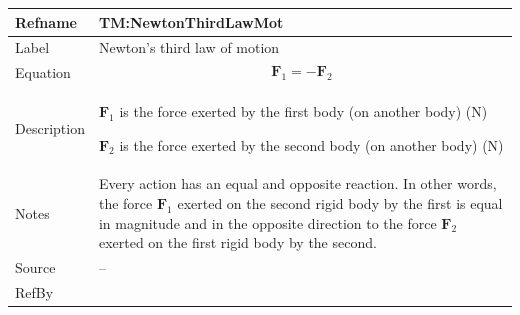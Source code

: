 \documentclass[12pt]{article}
\begin{document}
\begin{minipage}{\textwidth}
\begin{tabular}{>{\raggedright}p{}>{\raggedright\arraybackslash}p{}}
\toprule \textbf{Refname} & \textbf{TM:NewtonThirdLawMot}
\label{TM:NewtonThirdLawMot}
\\ \midrule
Label & Newton's third law of motion
        
\\ \midrule
Equation & \begin{displaymath}
           {\symbf{F}_{1}}=-{\symbf{F}_{2}}
           \end{displaymath}
\\ \midrule
Description & \begin{symbDescription}
              \item{${\symbf{F}_{1}}$ is the force exerted by the first body (on another body) (${\text{N}}$)}
              \item{${\symbf{F}_{2}}$ is the force exerted by the second body (on another body) (${\text{N}}$)}
              \end{symbDescription}
\\ \midrule
Notes & Every action has an equal and opposite reaction. In other words, the force ${\symbf{F}_{1}}$ exerted on the second rigid body by the first is equal in magnitude and in the opposite direction to the force ${\symbf{F}_{2}}$ exerted on the first rigid body by the second.
        
\\ \midrule
Source & --
         
\\ \midrule
RefBy & 
\\ \bottomrule
\end{tabular}
\end{minipage}
\vspace{\baselineskip}
\noindent
\end{document}
